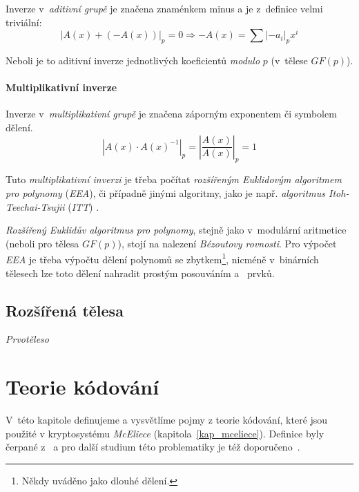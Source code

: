 \documentclass[thesis=M,czech,hidelinks]{FITthesis}[2012/06/26]
\newcommand{\0}{{\textcolor[gray]{0.80}{0}}}
\begin{document}
Inverze v~\emph{aditivní grupě} je značena znaménkem minus \uv{$-$} a je
z~definice velmi triviální:
$$
    \left| A(x) + (-A(x)) \right|_p = 0 \Rightarrow -A(x) =
    \sum \left|-a_i\right|_p x^i
$$

Neboli je to aditivní inverze jednotlivých koeficientů \emph{modulo} $p$
(v~tělese $GF(p)$).


\subsubsection{Multiplikativní inverze}

Inverze v~\emph{multiplikativní grupě} je značena záporným exponentem
 či symbolem dělení.
$$
    \left| A(x) \cdot A(x)^{-1} \right|_p = \left| \frac{A(x)}{A(x)} \right|_p = 1
$$

Tuto \emph{multiplikativní inverzi} je třeba počítat \emph{rozšířeným Euklidovým
algoritmem pro polynomy} (\emph{EEA}), či případně jinými algoritmy, jako je
např. \emph{algoritmus Itoh-Teechai-Tsujii} (\emph{ITT}) \cite{FIT_BHW,ITT}.

\emph{Rozšířený Euklidův algoritmus} \emph{pro polynomy}, stejně jako
v~modulární aritmetice (neboli pro tělesa $GF(p)$), stojí na nalezení
\emph{Bézoutovy rovnosti}. Pro výpočet \emph{EEA} je třeba výpočtu dělení
polynomů se zbytkem\footnote{
    Někdy uváděno jako dlouhé dělení.
}, nicméně v~binárních tělesech lze toto dělení nahradit prostým posouváním
a~ prvků.


\section{Rozšířená tělesa}

\emph{Prvotěleso}





\chapter{Teorie kódování}\label{kap_kody}

V~této kapitole definujeme a vysvětlíme pojmy z teorie kódování, které jsou
použité v kryptosystému \emph{McEliece} (kapitola~\ref{kap_mceliece}). Definice
byly čerpané z~\cite{FIT_AAK,Adamek} a pro další studium této problematiky je
též doporučeno~\cite{McEliece_coding}.
\end{document}
